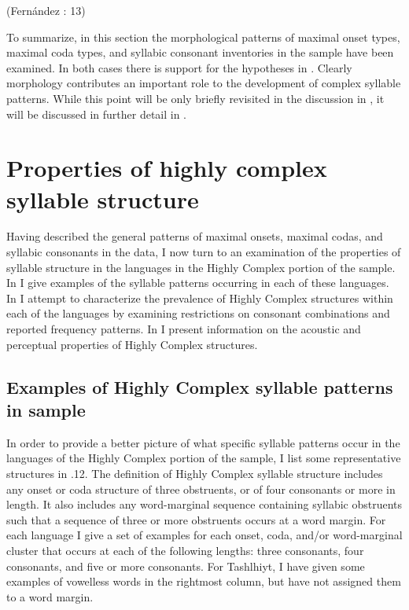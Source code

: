 (Fernández \citealt{GarayHernández2006}: 13)
\z

  To summarize, in this section the morphological patterns of maximal onset types, maximal coda types, and syllabic consonant inventories in the sample have been examined. In both cases there is support for the hypotheses in . Clearly morphology contributes an important role to the development of complex syllable patterns. While this point will be only briefly revisited in the discussion in , it will be discussed in further detail in .

\section{Properties of highly complex syllable structure}\label{sec:3.4}

  Having described the general patterns of maximal onsets, maximal codas, and syllabic consonants in the data, I now turn to an examination of the properties of syllable structure in the languages in the Highly Complex portion of the sample. In  I give examples of the syllable patterns occurring in each of these languages. In  I attempt to characterize the prevalence of Highly Complex structures within each of the languages by examining restrictions on consonant combinations and reported frequency patterns. In  I present information on the acoustic and perceptual properties of Highly Complex structures.

\subsection{Examples of Highly Complex syllable patterns in sample}\label{sec:3.4.1}

  In order to provide a better picture of what specific syllable patterns occur in the languages of the Highly Complex portion of the sample, I list some representative structures in .12. The definition of Highly Complex syllable structure includes any onset or coda structure of three obstruents, or of four consonants or more in length. It also includes any word-marginal sequence containing syllabic obstruents such that a sequence of three or more obstruents occurs at a word margin. For each language I give a set of examples for each onset, coda, and/or word-marginal cluster that occurs at each of the following lengths: three consonants, four consonants, and five or more consonants. For Tashlhiyt, I have given some examples of vowelless words in the rightmost column, but have not assigned them to a word margin.

